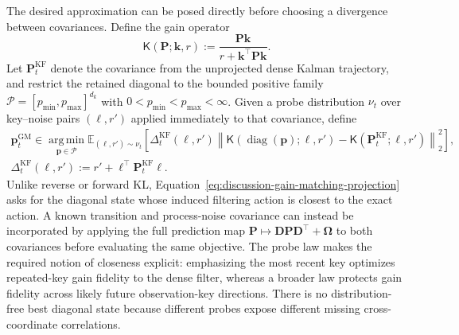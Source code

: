 \documentclass[11pt]{article}
\newcommand{\vct}[1]{\boldsymbol{#1}}
\newcommand{\diag}{\operatorname{diag}}
\begin{document}
The desired approximation can be posed directly before choosing a divergence between
covariances. Define the gain operator
\begin{equation}
  \mathsf{K}(\vct{P};\vct{k},r)
  :=\frac{\vct{P}\vct{k}}
    {r+\vct{k}^{\top}\vct{P}\vct{k}}.
  \label{eq:discussion-gain-operator}
\end{equation}
Let $\vct{P}_t^{\mathrm{KF}}$ denote the covariance from the unprojected dense Kalman trajectory,
and restrict the retained diagonal to the bounded positive family
$\mathcal{P}=[p_{\min},p_{\max}]^{d_k}$ with
$0<p_{\min}<p_{\max}<\infty$. Given a probe distribution
$\nu_t$ over key--noise pairs $(\vct{\ell},r')$ applied immediately to that covariance, define
\begin{equation}
\begin{aligned}
  \vct{p}_t^{\mathrm{GM}}
  \in\operatorname*{arg\,min}_{\vct{p}\in\mathcal{P}}
  \mathbb{E}_{(\vct{\ell},r')\sim\nu_t}\!\left[
    \Delta_t^{\mathrm{KF}}(\vct{\ell},r')
    \left\|
      \mathsf{K}(\diag(\vct{p});\vct{\ell},r')
      -\mathsf{K}(\vct{P}_t^{\mathrm{KF}};\vct{\ell},r')
    \right\|_2^2
  \right],\\
  \Delta_t^{\mathrm{KF}}(\vct{\ell},r')
  :=r'+\vct{\ell}^\top\vct{P}_t^{\mathrm{KF}}\vct{\ell}.
  \label{eq:discussion-gain-matching-projection}
\end{aligned}
\end{equation}
Unlike reverse or forward KL, Equation~\eqref{eq:discussion-gain-matching-projection} asks for the
diagonal state whose induced filtering action is closest to the exact action. A known transition
and process-noise covariance can instead be incorporated by applying the full prediction map
$\vct{P}\mapsto\vct{D}\vct{P}\vct{D}^\top+\vct{\Omega}$ to both covariances before evaluating
the same objective. The probe law
makes the required notion of closeness explicit: emphasizing the most recent key optimizes
repeated-key gain fidelity to the dense filter, whereas a broader law protects gain fidelity across
likely future observation-key
directions. There is no distribution-free best diagonal state because different probes expose
different missing cross-coordinate correlations.
\end{document}
